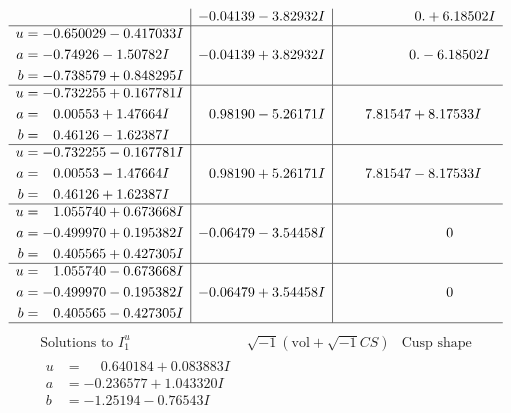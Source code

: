 \documentclass[1p]{elsarticle_modified}
\theoremstyle{definition}
\newcommand{\I}{\sqrt{-1}}
\begin{document}
$$\begin{array}{c|c|c}
 & -0.04139 - 3.82932 I & \phantom{-0.000000 -}0. + 6.18502 I \\ \hline\begin{aligned}
u &= -0.650029 - 0.417033 I \\
a &= -0.74926 - 1.50782 I \\
b &= -0.738579 + 0.848295 I\end{aligned}
 & -0.04139 + 3.82932 I & \phantom{-0.000000 } 0. - 6.18502 I \\ \hline\begin{aligned}
u &= -0.732255 + 0.167781 I \\
a &= \phantom{-}0.00553 + 1.47664 I \\
b &= \phantom{-}0.46126 - 1.62387 I\end{aligned}
 & \phantom{-}0.98190 - 5.26171 I & \phantom{-}7.81547 + 8.17533 I \\ \hline\begin{aligned}
u &= -0.732255 - 0.167781 I \\
a &= \phantom{-}0.00553 - 1.47664 I \\
b &= \phantom{-}0.46126 + 1.62387 I\end{aligned}
 & \phantom{-}0.98190 + 5.26171 I & \phantom{-}7.81547 - 8.17533 I \\ \hline\begin{aligned}
u &= \phantom{-}1.055740 + 0.673668 I \\
a &= -0.499970 + 0.195382 I \\
b &= \phantom{-}0.405565 + 0.427305 I\end{aligned}
 & -0.06479 - 3.54458 I & \phantom{-0.000000 } 0 \\ \hline\begin{aligned}
u &= \phantom{-}1.055740 - 0.673668 I \\
a &= -0.499970 - 0.195382 I \\
b &= \phantom{-}0.405565 - 0.427305 I\end{aligned}
 & -0.06479 + 3.54458 I & \phantom{-0.000000 } 0\\
 \hline 
 \end{array}$$\newpage$$\begin{array}{c|c|c}  
\text{Solutions to }I^u_{1}& \I (\text{vol} + \sqrt{-1}CS) & \text{Cusp shape}\\
 \hline 
\begin{aligned}
u &= \phantom{-}0.640184 + 0.083883 I \\
a &= -0.236577 + 1.043320 I \\
b &= -1.25194 - 0.76543 I\end{aligned}

\end{array}$$
\end{document}
